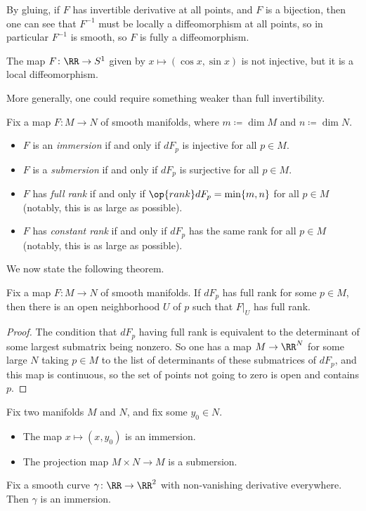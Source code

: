 \documentclass[../notes.tex]{subfiles}
\begin{document}
\begin{remark}
	By gluing, if $F$ has invertible derivative at all points, and $F$ is a bijection, then one can see that $F^{-1}$ must be locally a diffeomorphism at all points, so in particular $F^{-1}$ is smooth, so $F$ is fully a diffeomorphism.
\end{remark}
\begin{example}
	The map $F\colon\RR\to S^1$ given by $x\mapsto(\cos x,\sin x)$ is not injective, but it is a local diffeomorphism.
\end{example}
More generally, one could require something weaker than full invertibility.
\begin{defihelper}    
	Fix a map $F\colon M\to N$ of smooth manifolds, where $m\coloneqq\dim M$ and $n\coloneqq\dim N$.
	\begin{itemize}
		\item $F$ is an \textit{immersion} if and only if $dF_p$ is injective for all $p\in M$.
		\item $F$ is a \textit{submersion} if and only if $dF_p$ is surjective for all $p\in M$.
		\item $F$ has \textit{full rank} if and only if $\op{rank}dF_p=\min\{m,n\}$ for all $p\in M$ (notably, this is as large as possible).
		\item $F$ has \textit{constant rank} if and only if $dF_p$ has the same rank for all $p\in M$ (notably, this is as large as possible).
	\end{itemize}
\end{defihelper}
We now state the following theorem.
\begin{theorem}
	Fix a map $F\colon M\to N$ of smooth manifolds. If $dF_p$ has full rank for some $p\in M$, then there is an open neighborhood $U$ of $p$ such that $F|_U$ has full rank.
\end{theorem}
\begin{proof}
	The condition that $dF_p$ having full rank is equivalent to the determinant of some largest submatrix being nonzero. So one has a map $M\to\RR^N$ for some large $N$ taking $p\in M$ to the list of determinants of these submatrices of $dF_p$, and this map is continuous, so the set of points not going to zero is open and contains $p$.
\end{proof}
\begin{example}
	Fix two manifolds $M$ and $N$, and fix some $y_0\in N$.
	\begin{itemize}
		\item The map $x\mapsto(x,y_0)$ is an immersion.
		\item The projection map $M\times N\to M$ is a submersion.
	\end{itemize}
\end{example}
\begin{example}
	Fix a smooth curve $\gamma\colon\RR\to\RR^2$ with non-vanishing derivative everywhere. Then $\gamma$ is an immersion.
\end{example}
\end{document}
